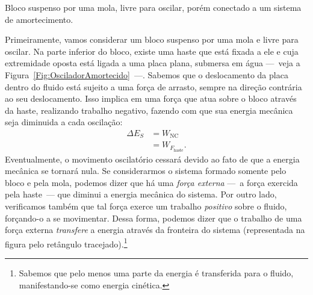\begin{marginfigure}
\centering
{}
\caption{Bloco suspenso por uma mola, livre para oscilar, porém conectado a um sistema de amortecimento.\label{Fig:OsciladorAmortecido}}
\end{marginfigure}

Primeiramente, vamos considerar um bloco suspenso por uma mola e livre para oscilar. Na parte inferior do bloco, existe uma haste que está fixada a ele e cuja extremidade oposta está ligada a uma placa plana, submersa em água ---~veja a Figura~\ref{Fig:OsciladorAmortecido}~---. Sabemos que o deslocamento da placa dentro do fluido está sujeito a uma força de arrasto, sempre na direção contrária ao seu deslocamento. Isso implica em uma força que atua sobre o bloco através da haste, realizando trabalho negativo, fazendo com que sua energia mecânica seja diminuida a cada oscilação:
\begin{align}
    \Delta E_S &= W_{\textrm{NC}} \\
    &= W_{F_{\textrm{haste}}}.
\end{align}
%
Eventualmente, o movimento oscilatório cessará devido ao fato de que a energia mecânica se tornará nula. Se considerarmos o sistema formado somente pelo bloco e pela mola, podemos dizer que há uma \emph{força externa} ---~a força exercida pela haste~--- que diminui a energia mecânica do sistema. Por outro lado, verificamos também que tal força exerce um trabalho \emph{positivo} sobre o fluido, forçando-o a se movimentar. Dessa forma, podemos dizer que o trabalho de uma força externa \emph{transfere} a energia através da fronteira do sistema (representada na figura pelo retângulo tracejado).\footnote{Sabemos que pelo menos uma parte da energia é transferida para o fluido, manifestando-se como energia cinética.}

